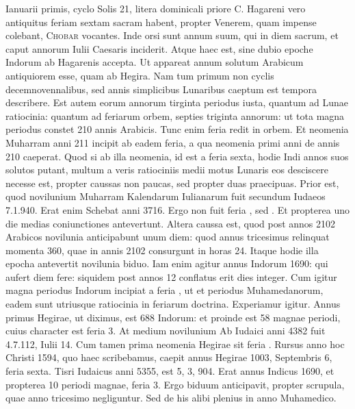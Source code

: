  Ianuarii primis,
cyclo Solis 21, litera dominicali priore C.
Hagareni vero antiquitus
feriam sextam sacram habent, propter Venerem, quam impense
colebant, \textsc{Chobar} vocantes.
%
Inde orsi sunt annum suum, qui in
diem sacrum, et caput annorum Iulii Caesaris inciderit.
Atque haec
est, sine dubio epoche Indorum ab Hagarenis accepta.
Ut appareat annum
solutum Arabicum antiquiorem esse, quam ab Hegira.
Nam
tum primum non cyclis decemnovennalibus, sed annis simplicibus
Lunaribus caeptum est tempora describere.
Est autem eorum annorum
tirginta periodus iusta, quantum ad Lunae ratiocinia: quantum ad feriarum
orbem, septies triginta annorum: ut tota magna periodus constet
210 annis Arabicis.
Tunc enim feria redit in orbem.
Et neomenia
Muharram anni 211 incipit ab eadem feria, a qua neomenia primi
anni de annis 210 caeperat.
Quod si ab illa neomenia, id est a feria
sexta, hodie Indi annos suos solutos putant, multum a veris ratiociniis
medii motus Lunaris eos desciscere necesse est, propter caussas non
paucas, sed propter duas praecipuas.
Prior est, quod novilunium Muharram
Kalendarum Iulianarum fuit secundum Iudaeos 7.1.940.
Erat enim Schebat anni 3716.
Ergo non fuit feria , sed .
Et
propterea uno die medias coniunctiones antevertunt.
Altera caussa
est, quod post annos 2102 Arabicos novilunia anticipabunt unum
diem: quod annus tricesimus relinquat momenta 360, quae in annis
2102 consurgunt in horas 24.
Itaque hodie illa epocha antevertit novilunia
biduo.
Iam enim agitur annus Indorum 1690: qui aufert diem
fere: siquidem post annos 12 conflatus erit dies integer.
Cum igitur
magna periodus Indorum incipiat a feria ,
 ut et periodus Muhamedanorum,
eadem sunt utriusque ratiocinia in feriarum doctrina.
Experiamur
igitur.
Annus primus Hegirae, ut diximus, est 688 Indorum: et
proinde est 58 magnae periodi, cuius character est feria 3.
At medium
novilunium Ab Iudaici anni 4382 fuit 4.7.112, Iulii 14.
Cum tamen
prima neomenia Hegirae sit feria .
Rursus anno hoc Christi 1594,
quo haec scribebamus, caepit annus Hegirae 1003, Septembris 6, feria
sexta.
Tisri Iudaicus anni 5355, est 5, 3, 904.
Erat annus Indicus 1690,
et propterea 10 periodi magnae, feria 3.
Ergo biduum anticipavit, propter
scrupula, quae anno tricesimo negliguntur.
Sed de his alibi plenius
in anno Muhamedico.
